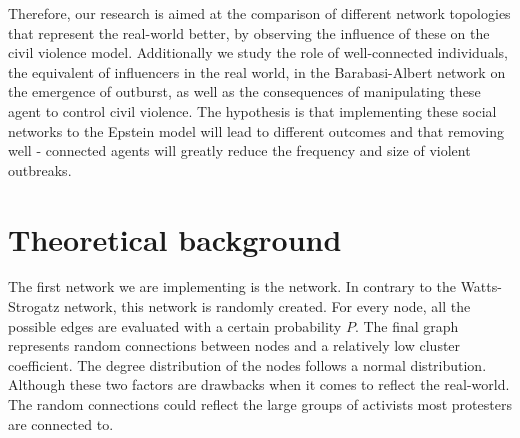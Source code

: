 \documentclass[10pt]{article}
\begin{document}
    Therefore, our research is aimed at the comparison of different network topologies that represent the real-world better, by observing the influence of these on the civil violence model. Additionally we study the role of well-connected individuals, the equivalent of influencers in the real world, in the Barabasi-Albert network on the emergence of outburst, as well as the consequences of manipulating these agent to control civil violence. The hypothesis is that implementing these social networks to the Epstein model will lead to different outcomes and that removing well - connected agents will greatly reduce the frequency and size of violent outbreaks.


    \newpage

    \section*{Theoretical background}

    The first network we are implementing is the \cite{erdHos1960evolution} network. In contrary to the Watts-Strogatz network, this network is randomly created. For every node, all the possible edges are evaluated with a certain probability $P$. The final graph represents random connections between nodes and a relatively low cluster coefficient. The degree distribution of the nodes follows a normal distribution. Although these two factors are drawbacks when it comes to reflect the real-world. The random connections could reflect the large groups of activists most protesters are connected to.
\end{document}
